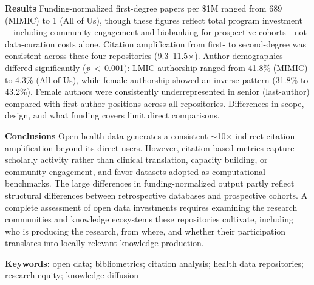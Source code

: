 \documentclass[11pt]{article}
\begin{document}
\noindent\textbf{Results}\quad
Funding-normalized first-degree papers per \$1M ranged from 689 (MIMIC) to 1 (All of Us), though these figures reflect total program investment---including community engagement and biobanking for prospective cohorts---not data-curation costs alone. Citation amplification from first- to second-degree was consistent across these four repositories (9.3--11.5$\times$). Author demographics differed significantly (\textit{p}\,$<$\,0.001): LMIC authorship ranged from 41.8\% (MIMIC) to 4.3\% (All of Us), while female authorship showed an inverse pattern (31.8\% to 43.2\%). Female authors were consistently underrepresented in senior (last-author) compared with first-author positions across all repositories. Differences in scope, design, and what funding covers limit direct comparisons.

\noindent\textbf{Conclusions}\quad
Open health data generates a consistent ${\sim}$10$\times$ indirect citation amplification beyond its direct users. However, citation-based metrics capture scholarly activity rather than clinical translation, capacity building, or community engagement, and favor datasets adopted as computational benchmarks. The large differences in funding-normalized output partly reflect structural differences between retrospective databases and prospective cohorts. A complete assessment of open data investments requires examining the research communities and knowledge ecosystems these repositories cultivate, including who is producing the research, from where, and whether their participation translates into locally relevant knowledge production.

\vspace{1em}

\noindent\textbf{Keywords:} open data; bibliometrics; citation analysis; health data repositories; research equity; knowledge diffusion

\newpage

\end{document}
